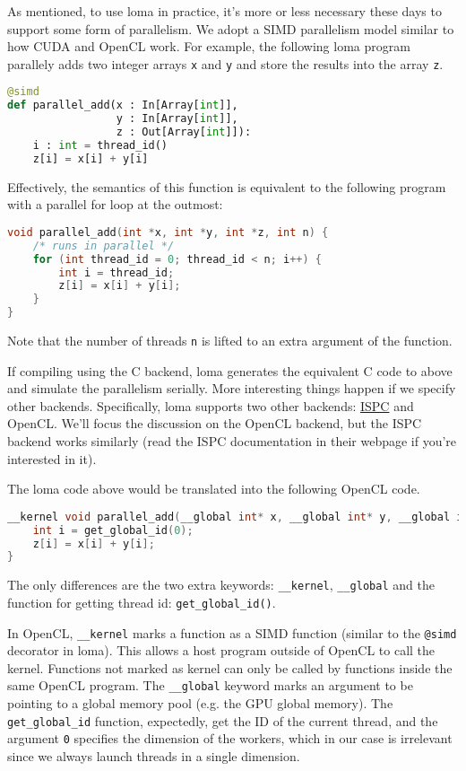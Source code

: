 As mentioned, to use loma in practice, it's more or less necessary these days to support some form of parallelism. We adopt a SIMD parallelism model similar to how CUDA and OpenCL work. For example, the following loma program parallely adds two integer arrays \lstinline{x} and \lstinline{y} and store the results into the array \lstinline{z}.
\begin{lstlisting}[language=python] 
@simd
def parallel_add(x : In[Array[int]],
                 y : In[Array[int]],
                 z : Out[Array[int]]):
    i : int = thread_id()
    z[i] = x[i] + y[i]
\end{lstlisting}

Effectively, the semantics of this function is equivalent to the following program with a parallel for loop at the outmost:
\begin{lstlisting}[language=c]
void parallel_add(int *x, int *y, int *z, int n) {
    /* runs in parallel */
    for (int thread_id = 0; thread_id < n; i++) {
        int i = thread_id;
        z[i] = x[i] + y[i];
    }
}
\end{lstlisting}
Note that the number of threads \lstinline{n} is lifted to an extra argument of the function.

If compiling using the C backend, loma generates the equivalent C code to above and simulate the parallelism serially. More interesting things happen if we specify other backends. Specifically, loma supports two other backends: \href{https://ispc.github.io/}{ISPC} and OpenCL. We'll focus the discussion on the OpenCL backend, but the ISPC backend works similarly (read the ISPC documentation in their webpage if you're interested in it).

The loma code above would be translated into the following OpenCL code.
\begin{lstlisting}[language=c]
__kernel void parallel_add(__global int* x, __global int* y, __global int* z) {
    int i = get_global_id(0);
    z[i] = x[i] + y[i];
}
\end{lstlisting}

The only differences are the two extra keywords: \lstinline{__kernel}, \lstinline{__global} and the function for getting thread id: \lstinline{get_global_id()}. 

In OpenCL, \lstinline{__kernel} marks a function as a SIMD function (similar to the \lstinline{@simd} decorator in loma). This allows a host program outside of OpenCL to call the kernel. Functions not marked as kernel can only be called by functions inside the same OpenCL program. The \lstinline{__global} keyword marks an argument to be pointing to a global memory pool (e.g. the GPU global memory). The \lstinline{get_global_id} function, expectedly, get the ID of the current thread, and the argument \lstinline{0} specifies the dimension of the workers, which in our case is irrelevant since we always launch threads in a single dimension. 

